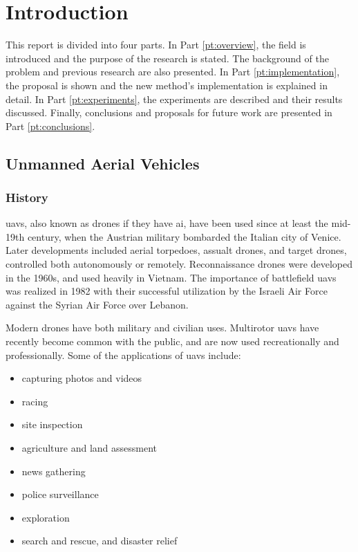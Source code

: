 \chapter{Introduction}
\label{ch:intro}
This report is divided into four parts.
In Part \ref{pt:overview}, the field is introduced and the purpose of the research is stated.
The background of the problem and previous research are also presented.
In Part \ref{pt:implementation}, the proposal is shown and the new method's implementation is explained in detail.
In Part \ref{pt:experiments}, the experiments are described and their results discussed.
Finally, conclusions and proposals for future work are presented in Part \ref{pt:conclusions}.

\section{Unmanned Aerial Vehicles}
\subsection{History}
\Glspl{uav}, also known as drones if they have \gls{ai}, have been used since at least the mid-19th century, when the Austrian military bombarded the Italian city of Venice.\cite{monash2003}
Later developments included aerial torpedoes, assualt drones, and target drones, controlled both autonomously or remotely.
Reconnaissance drones were developed in the 1960s, and used heavily in Vietnam.
The importance of battlefield \glspl{uav} was realized in 1982 with their successful utilization by the Israeli Air Force against the Syrian Air Force over Lebanon.\cite{draganfly2009}

Modern drones have both military and civilian uses.
Multirotor \glspl{uav} have recently become common with the public, and are now used recreationally and professionally.
Some of the applications of \glspl{uav} include:

\begin{itemize}
  \item capturing photos and videos
  \item racing
  \item site inspection
  \item agriculture and land assessment
  \item news gathering
  \item police surveillance
  \item exploration
  \item search and rescue, and disaster relief
\end{itemize}

